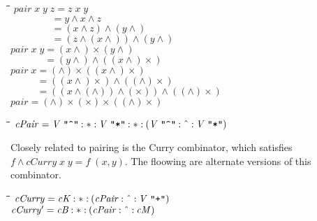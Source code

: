 \documentclass{article}
\newlength{\lwidth}\setlength{\lwidth}{4.5cm}
\newlength{\cwidth}\setlength{\cwidth}{8mm} %
\newcommand{\Conid}[1]{\mathit{#1}}
\newcommand{\Varid}[1]{\mathit{#1}}
\begin{document}
\begin{tabbing}
\qquad\=\hspace{\lwidth}\=\hspace{\cwidth}\=\+\kill
${\Varid{pair}\;\Varid{x}\;\Varid{y}\;\Varid{z}\mathrel{=}\Varid{z}\;\Varid{x}\;\Varid{y}}$\\
${\phantom{\Varid{pair}\;\Varid{x}\;\Varid{y}\;\Varid{z}\mbox{}}\mathrel{=}\Varid{y}\wedge\Varid{x}\wedge\Varid{z}}$\\
${\phantom{\Varid{pair}\;\Varid{x}\;\Varid{y}\;\Varid{z}\mbox{}}\mathrel{=}(\Varid{x}\wedge\Varid{z})\wedge(\Varid{y}\wedge)}$\\
${\phantom{\Varid{pair}\;\Varid{x}\;\Varid{y}\;\Varid{z}\mbox{}}\mathrel{=}(\Varid{z}\wedge(\Varid{x}\wedge))\wedge(\Varid{y}\wedge)}$\\
${\Varid{pair}\;\Varid{x}\;\Varid{y}\mathrel{=}(\Varid{x}\wedge)\times(\Varid{y}\wedge)}$\\
${\phantom{\Varid{pair}\;\Varid{x}\;\Varid{y}\mbox{}}\mathrel{=}(\Varid{y}\wedge)\wedge((\Varid{x}\wedge)\times)}$\\
${\Varid{pair}\;\Varid{x}\mathrel{=}(\wedge)\times((\Varid{x}\wedge)\times)}$\\
${\phantom{\Varid{pair}\;\Varid{x}\mbox{}}\mathrel{=}((\Varid{x}\wedge)\times)\wedge((\wedge)\times)}$\\
${\phantom{\Varid{pair}\;\Varid{x}\mbox{}}\mathrel{=}((\Varid{x}\wedge(\wedge))\wedge(\times))\wedge((\wedge)\times)}$\\
${\Varid{pair}\mathrel{=}(\wedge)\times(\times)\times((\wedge)\times)}$
\end{tabbing}\begin{tabbing}
\qquad\=\hspace{\lwidth}\=\hspace{\cwidth}\=\+\kill
${\Varid{cPair}\mathrel{=}\Conid{V}\;\text{\ttfamily \char34 \char94 \char34}\mathbin{:*:}\Conid{V}\;\text{\ttfamily \char34 *\char34}\mathbin{:*:}(\Conid{V}\;\text{\ttfamily \char34 \char94 \char34}\mathbin{:\char94 :}\Conid{V}\;\text{\ttfamily \char34 *\char34})}$
\end{tabbing}
Closely related to pairing is the Curry combinator,
which
satisfies \ensuremath{\Varid{f}\wedge\Varid{cCurry}\;\Varid{x}\;\Varid{y}\mathrel{=}\Varid{f}\;(\Varid{x},\Varid{y})}.
The floowing are alternate versions of this combinator.
\begin{tabbing}
\qquad\=\hspace{\lwidth}\=\hspace{\cwidth}\=\+\kill
${\Varid{cCurry}\mathrel{=}\Varid{cK}\mathbin{:*:}(\Varid{cPair}\mathbin{:\char94 :}\Conid{V}\;\text{\ttfamily \char34 +\char34})}$\\
${\Varid{cCurry'}\mathrel{=}\Varid{cB}\mathbin{:*:}(\Varid{cPair}\mathbin{:\char94 :}\Varid{cM})}$
\end{tabbing}
\end{document}
